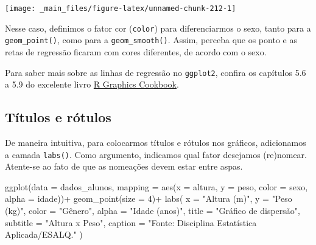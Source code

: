 \documentclass[
  brazilian,
]{book}
\newenvironment{Shaded}{\begin{snugshade}}{\end{snugshade}}
\newcommand{\AttributeTok}[1]{\textcolor[rgb]{0.77,0.63,0.00}{#1}}
\newcommand{\DecValTok}[1]{\textcolor[rgb]{0.00,0.00,0.81}{#1}}
\newcommand{\FunctionTok}[1]{\textcolor[rgb]{0.00,0.00,0.00}{#1}}
\newcommand{\NormalTok}[1]{#1}
\newcommand{\SpecialCharTok}[1]{\textcolor[rgb]{0.00,0.00,0.00}{#1}}
\newcommand{\StringTok}[1]{\textcolor[rgb]{0.31,0.60,0.02}{#1}}
\begin{document}
\begin{center}\texttt{[image: \_main\_files/figure-latex/unnamed-chunk-212-1]} \end{center}

Nesse caso, definimos o fator cor (\texttt{color}) para diferenciarmos o sexo, tanto para a \texttt{geom\_point()}, como para a \texttt{geom\_smooth()}. Assim, perceba que os ponto e as retas de regressão ficaram com cores diferentes, de acordo com o sexo.

Para saber mais sobre as linhas de regressão no \texttt{ggplot2}, confira os capítulos 5.6 a 5.9 do excelente livro \href{https://r-graphics.org/recipe-scatter-fitlines}{R Graphics Cookbook}.

\hypertarget{tuxedtulos-e-ruxf3tulos}{%
\subsection{Títulos e rótulos}\label{tuxedtulos-e-ruxf3tulos}}

De maneira intuitiva, para colocarmos títulos e rótulos nos gráficos, adicionamos a camada \texttt{labs()}. Como argumento, indicamos qual fator desejamos (re)nomear. Atente-se ao fato de que as nomeações devem estar entre aspas.

\begin{Shaded}
\begin{Highlighting}[]
\FunctionTok{ggplot}\NormalTok{(}\AttributeTok{data =}\NormalTok{ dados\_alunos,}
       \AttributeTok{mapping =} \FunctionTok{aes}\NormalTok{(}\AttributeTok{x =}\NormalTok{ altura,}
                     \AttributeTok{y =}\NormalTok{ peso,}
                     \AttributeTok{color =}\NormalTok{ sexo,}
                     \AttributeTok{alpha =}\NormalTok{ idade))}\SpecialCharTok{+}
  \FunctionTok{geom\_point}\NormalTok{(}\AttributeTok{size =} \DecValTok{4}\NormalTok{)}\SpecialCharTok{+}
  \FunctionTok{labs}\NormalTok{(}
    \AttributeTok{x =} \StringTok{"Altura (m)"}\NormalTok{,}
    \AttributeTok{y =} \StringTok{"Peso (kg)"}\NormalTok{,}
    \AttributeTok{color =} \StringTok{"Gênero"}\NormalTok{,}
    \AttributeTok{alpha =} \StringTok{"Idade (anos)"}\NormalTok{,}
    \AttributeTok{title =} \StringTok{"Gráfico de dispersão"}\NormalTok{,}
    \AttributeTok{subtitle =} \StringTok{"Altura x Peso"}\NormalTok{,}
    \AttributeTok{caption =} \StringTok{"Fonte: Disciplina Estatística Aplicada/ESALQ."}
\NormalTok{  )}
\end{Highlighting}
\end{Shaded}
\end{document}
